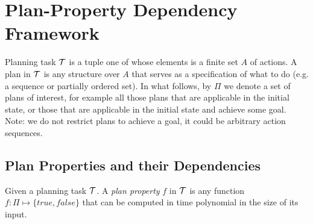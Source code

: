 \section{Plan-Property Dependency Framework}



Planning task $\cal T$ is a tuple one of whose elements is a finite
set $A$ of actions. A plan in $\cal T$ is any structure over $A$ that
serves as a specification of what to do (e.g. a sequence or partially
ordered set). In what follows, by $\Pi$ we denote a set of plans of
interest, for example all those plans that are applicable in the
initial state, or those that are applicable in the initial state and
achieve some goal. Note: we do not restrict plans to achieve a goal,
it could be arbitrary action sequences.


\subsection{Plan Properties and their Dependencies}


%

\begin{definition}
Given a planning task $\cal T$. A \emph{plan property} $f$ in $\cal T$
is any function $f : \Pi \mapsto \{true, false\}$ that can be computed
in time polynomial in the size of its input.
\end{definition}



%
%

